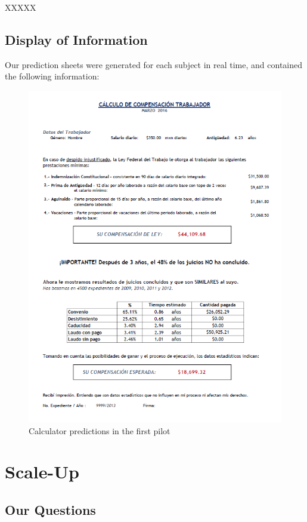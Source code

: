\documentclass[]{article}
\begin{document}
XXXXX

\subsection{Display of Information}\label{display-of-information}

Our prediction sheets were generated for each subject in real time, and
contained the following information:

\begin{figure}[htbp]
\centering
\includegraphics{../Paper/Figuras/calctreat.png}
\caption{Calculator predictions in the first pilot}
\end{figure}

\section{Scale-Up}\label{scale-up}

\subsection{Our Questions}\label{our-questions-1}
\end{document}
